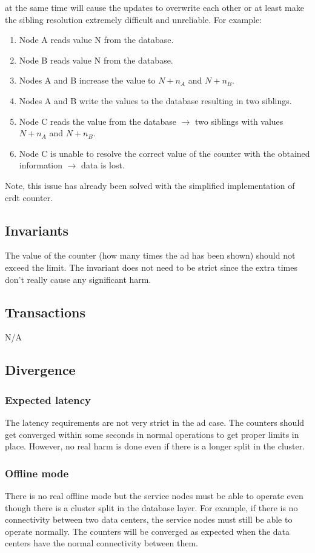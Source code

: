 \documentclass[11pt,a4paper]{report}
\begin{document}
at the same time will cause the updates to overwrite each other or at least make the sibling resolution extremely difficult and unreliable.
For example:
\begin{enumerate}
\item Node A reads value N from the database.
\item Node B reads value N from the database. 
\item Nodes A and B increase the value to $N+n_A$ and $N+n_B$. 
\item Nodes A and B write the values to the database resulting in two siblings. 
\item Node C reads the value from the database $\rightarrow$ two siblings with values $N+n_A$ and $N+n_B$. 
\item Node C is unable to resolve the correct value of the counter with the obtained information $\rightarrow$ data is lost.
\end{enumerate}

Note, this issue has already been solved with the simplified implementation of \gls{crdt} counter.

\subsection{Invariants}
The value of the counter (how many times the ad has been shown) should not exceed the limit. 
The invariant does not need to be strict since the extra times don't really cause any significant harm.

\subsection{Transactions}
N/A

\subsection{Divergence}
\subsubsection{Expected latency}
The latency requirements are not very strict in the ad case. The counters should get converged within some seconds in normal operations to get proper limits in place. However, no real harm is done even if there is a longer split in the cluster.

\subsubsection{Offline mode}
There is no real offline mode but the service nodes must be able to operate even though there is a cluster split in the database layer. For example, if there is no connectivity between two data centers, the service nodes must still be able to operate normally. The counters will be converged as expected when the data centers have the normal connectivity between them.
\end{document}
